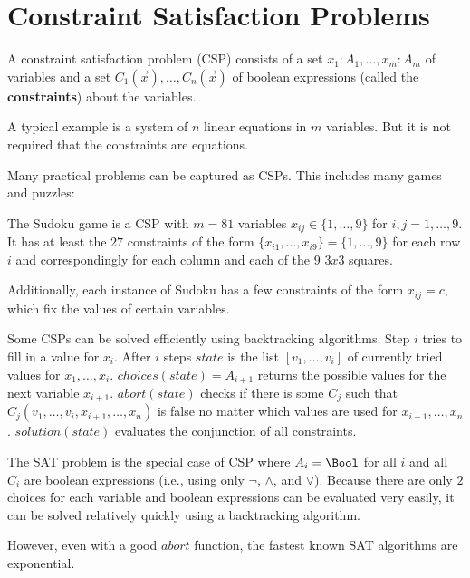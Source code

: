 \section{Constraint Satisfaction Problems}

A constraint satisfaction problem (CSP) consists of a set $x_1:A_1,\ldots,x_m:A_m$ of variables and a set $C_1(\vec{x}),\ldots,C_n(\vec{x	})$ of boolean expressions (called the \textbf{constraints}) about the variables.

A typical example is a system of $n$ linear equations in $m$ variables.
But it is not required that the constraints are equations.

Many practical problems can be captured as CSPs.
This includes many games and puzzles:

\begin{example}[Sudoku]
The Sudoku game is a CSP with $m=81$ variables $x_{ij}\in\{1,\ldots,9\}$ for $i,j=1,\ldots,9$.
It has at least the $27$ constraints of the form $\{x_{i1},\ldots,x_{i9}\}=\{1,\ldots,9\}$ for each row $i$ and correspondingly for each column and each of the $9$ $3x3$ squares.

Additionally, each instance of Sudoku has a few constraints of the form $x_{ij}=c$, which fix the values of certain variables.
\end{example}

Some CSPs can be solved efficiently using backtracking algorithms.
Step $i$ tries to fill in a value for $x_i$.
After $i$ steps $state$ is the list $[v_1,\ldots,v_i]$ of currently tried values for $x_1,\ldots,x_i$.
$choices(state)=A_{i+1}$ returns the possible values for the next variable $x_{i+1}$.
$abort(state)$ checks if there is some $C_j$ such that $C_j(v_1,\ldots,v_i,x_{i+1},\ldots,x_n)$ is false no matter which values are used for $x_{i+1},\ldots,x_n$.
$solution(state)$ evaluates the conjunction of all constraints.

\begin{example}[SAT]
The SAT problem is the special case of CSP where $A_i=\Bool$ for all $i$ and all $C_i$ are boolean expressions (i.e., using only $\neg$, $\wedge$, and $\vee$).
Because there are only $2$ choices for each variable and boolean expressions can be evaluated very easily, it can be solved relatively quickly using a backtracking algorithm.

However, even with a good $abort$ function, the fastest known SAT algorithms are exponential.
\end{example}

